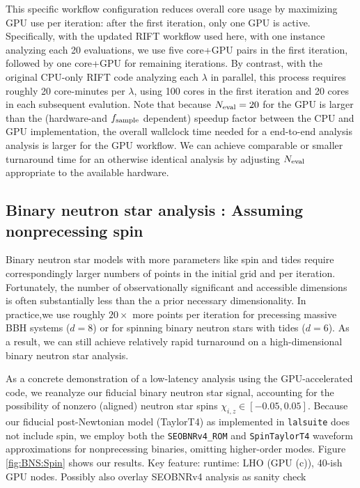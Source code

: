 \documentclass[twocolumn,prd,nofootinbib]{revtex4}
\newcommand\editremark[1]{{\color{red} #1}}
\begin{document}
This specific workflow configuration  reduces overall core usage by maximizing GPU use per iteration: after the first
iteration, only one GPU is active.   
Specifically,  with the updated RIFT workflow used here, with one instance analyzing each 20 evaluations,  we use five
core+GPU pairs in the
first iteration, followed by one core+GPU for remaining iterations.
By contrast, with the original CPU-only RIFT code analyzing each $\lambda$ in parallel, this process requires roughly 20 core-minutes
per $\lambda$, using 100 cores in the first iteration and 20 cores in each
subsequent evalution.   
Note that  because   $N_{\rm eval}=20$ for the GPU is larger than the (hardware-and $f_{\rm sample}$ dependent)  speedup factor between the CPU and
GPU implementation, the overall wallclock time needed for a end-to-end
analysis analysis is larger for the GPU workflow.
We can achieve comparable or smaller turnaround time for an otherwise identical analysis by adjusting $N_{\rm eval}$ appropriate to the available hardware.









\subsection{Binary neutron star analysis : Assuming  nonprecessing spin}
\label{sec:sub:BNS_spin}


Binary neutron star models with more parameters like spin and tides require correspondingly larger numbers of points in the
  initial grid and per iteration.  Fortunately, the number of observationally significant and accessible dimensions is often
  substantially less than the a prior necessary dimensionality.  In practice,we use roughly $20\times$ more points per
  iteration for precessing massive BBH systems ($d=8$) or for spinning binary neutron stars with tides ($d=6$).    As a
  result, we can still achieve relatively rapid turnaround on a high-dimensional binary neutron star analysis.

As a concrete demonstration of a low-latency analysis using the GPU-accelerated code, we reanalyze our fiducial binary
neutron star signal, accounting for the possibility of nonzero (aligned) neutron star spins
$\chi_{i,z}\in[-0.05,0.05]$.  
Because  our fiducial post-Newtonian model (TaylorT4) as implemented in \texttt{lalsuite} does not include spin, we
employ both the \texttt{SEOBNRv4\_ROM} and \texttt{SpinTaylorT4} waveform approximations for nonprecessing binaries,
omitting higher-order modes.
%
Figure \ref{fig:BNS:Spin} shows our results.
\editremark{Key feature: runtime: LHO (GPU (c)), 40-ish GPU nodes.  Possibly also overlay SEOBNRv4 analysis as sanity check}
\end{document}
